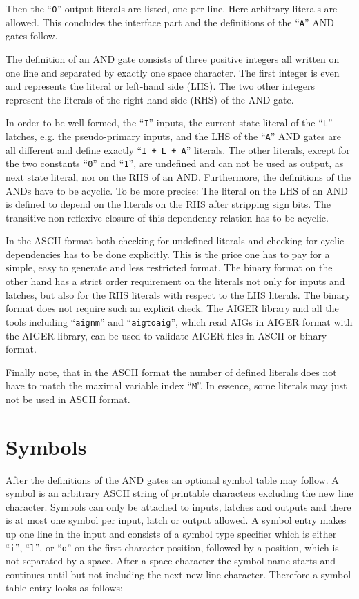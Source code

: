 \documentclass[10pt]{llncs}
\begin{document}
  Then the ``\texttt{O}'' output literals are listed, one per line.  Here arbitrary
  literals are allowed.  This concludes the interface part and the
  definitions of the ``\texttt{A}'' AND gates follow.

  The definition of an AND gate consists of three positive integers all
  written on one line and separated by exactly one space character.  The
  first integer is even and represents the literal or left-hand side (LHS).
  The two other integers represent the literals of the right-hand side
  (RHS) of the AND gate.

  In order to be well formed, the ``\texttt{I}'' inputs, the current state literal of
  the ``\texttt{L}'' latches, e.g. the pseudo-primary inputs, and the LHS of the
  ``\texttt{A}''
  AND gates are all different and define exactly ``\texttt{I + L + A}'' literals.  The
  other literals, except for the two constants ``\texttt{0}'' and ``\texttt{1}'', are undefined
  and can not be used as output, as next state literal, nor on the RHS of an
  AND.  Furthermore, the definitions of the ANDs have to be acyclic.  To be
  more precise: The literal on the LHS of an AND is defined to depend on the
  literals on the RHS after stripping sign bits.  The transitive non
  reflexive closure of this dependency relation has to be acyclic.

  In the ASCII format both checking for undefined literals and checking for
  cyclic dependencies has to be done explicitly.  This is the price one has
  to pay for a simple, easy to generate and less restricted format.  The
  binary format on the other hand has a strict order requirement on the
  literals not only for inputs and latches, but also for the RHS literals
  with respect to the LHS literals.  The binary format does not require such
  an explicit check. The AIGER library and all the tools including
  ``\texttt{aignm}''
  and ``\texttt{aigtoaig}'', which read AIGs in AIGER format with the AIGER library,
  can be used to validate AIGER files in ASCII or binary format.

  Finally note, that in the ASCII format the number of defined literals does
  not have to match the maximal variable index ``\texttt{M}''.  In essence, some
  literals may just not be used in ASCII format.

\section{Symbols}
  
  After the definitions of the AND gates an optional symbol table may
  follow.  A symbol is an arbitrary ASCII string of printable characters
  excluding the new line character.  Symbols can only be attached to inputs,
  latches and outputs and there is at most one symbol per input, latch or
  output allowed.  A symbol entry makes up one line in the input and
  consists of a symbol type specifier which is either ``\texttt{i}'',
  ``\texttt{l}'', or ``\texttt{o}'' on
  the first character position, followed by a position, which is not
  separated by a space.  After a space character the symbol name starts and
  continues until but not including the next new line character.  Therefore
  a symbol table entry looks as follows:
    
\end{document}

